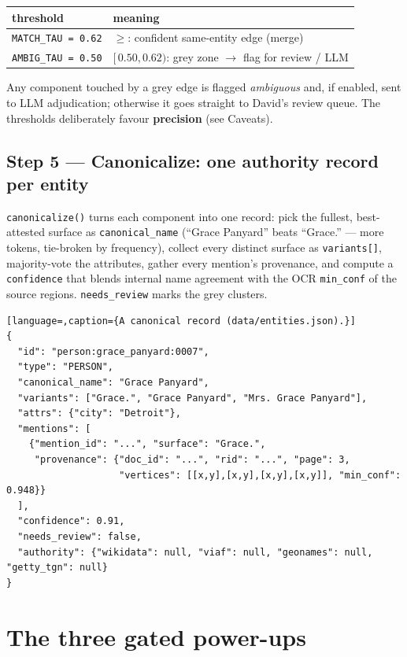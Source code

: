 \documentclass[11pt]{article}
\newcommand{\code}[1]{\texttt{#1}}
\begin{document}
\begin{center}
\small
\begin{tabular}{ll}
\toprule
threshold & meaning \\
\midrule
\code{MATCH\_TAU = 0.62} & $\ge$: confident same-entity edge (merge) \\
\code{AMBIG\_TAU = 0.50} & $[\,0.50, 0.62)$: grey zone $\to$ flag for review / LLM \\
\bottomrule
\end{tabular}
\end{center}

Any component touched by a grey edge is flagged \emph{ambiguous} and, if enabled,
sent to LLM adjudication; otherwise it goes straight to David's review queue. The
thresholds deliberately favour \textbf{precision} (see Caveats).

\subsection{Step 5 --- Canonicalize: one authority record per entity}

\code{canonicalize()} turns each component into one record: pick the fullest,
best-attested surface as \code{canonical\_name} (``Grace Panyard'' beats ``Grace.''
--- more tokens, tie-broken by frequency), collect every distinct surface as
\code{variants[]}, majority-vote the attributes, gather every mention's provenance,
and compute a \code{confidence} that blends internal name agreement with the OCR
\code{min\_conf} of the source regions. \code{needs\_review} marks the grey clusters.

\begin{lstlisting}[language=,caption={A canonical record (data/entities.json).}]
{
  "id": "person:grace_panyard:0007",
  "type": "PERSON",
  "canonical_name": "Grace Panyard",
  "variants": ["Grace.", "Grace Panyard", "Mrs. Grace Panyard"],
  "attrs": {"city": "Detroit"},
  "mentions": [
    {"mention_id": "...", "surface": "Grace.",
     "provenance": {"doc_id": "...", "rid": "...", "page": 3,
                    "vertices": [[x,y],[x,y],[x,y],[x,y]], "min_conf": 0.948}}
  ],
  "confidence": 0.91,
  "needs_review": false,
  "authority": {"wikidata": null, "viaf": null, "geonames": null, "getty_tgn": null}
}
\end{lstlisting}

\section{The three gated power-ups}
\end{document}
